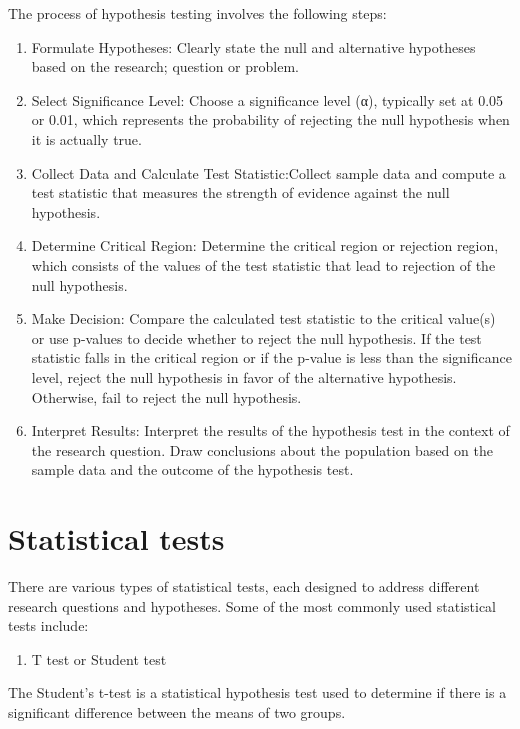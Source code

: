 \documentclass[
]{book}
\providecommand{\tightlist}{%
  \setlength{\itemsep}{0pt}\setlength{\parskip}{0pt}}
\begin{document}
The process of hypothesis testing involves the following steps:

\begin{enumerate}
\def\labelenumi{\arabic{enumi})}
\tightlist
\item
  Formulate Hypotheses: Clearly state the null and alternative hypotheses based on the research; question or problem.
\item
  Select Significance Level: Choose a significance level (α), typically set at 0.05 or 0.01, which represents the probability of rejecting the null hypothesis when it is actually true.
\item
  Collect Data and Calculate Test Statistic:Collect sample data and compute a test statistic that measures the strength of evidence against the null hypothesis.
\item
  Determine Critical Region: Determine the critical region or rejection region, which consists of the values of the test statistic that lead to rejection of the null hypothesis.
\item
  Make Decision: Compare the calculated test statistic to the critical value(s) or use p-values to decide whether to reject the null hypothesis. If the test statistic falls in the critical region or if the p-value is less than the significance level, reject the null hypothesis in favor of the alternative hypothesis. Otherwise, fail to reject the null hypothesis.
\item
  Interpret Results: Interpret the results of the hypothesis test in the context of the research question. Draw conclusions about the population based on the sample data and the outcome of the hypothesis test.
\end{enumerate}

\hypertarget{statistical-tests}{%
\section{Statistical tests}\label{statistical-tests}}

There are various types of statistical tests, each designed to address different research questions and hypotheses. Some of the most commonly used statistical tests include:

\begin{enumerate}
\def\labelenumi{\arabic{enumi}.}
\tightlist
\item
  T test or Student test
\end{enumerate}

The Student's t-test is a statistical hypothesis test used to determine if there is a significant difference between the means of two groups.
\end{document}
